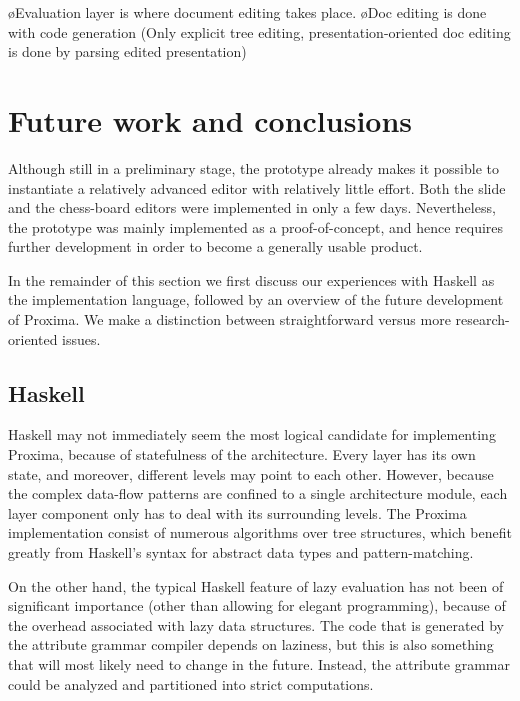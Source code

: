 \bl
\o Evaluation layer is where document editing takes place. 
\o Doc editing is done with code generation (Only explicit tree editing, presentation-oriented doc editing is done by parsing edited presentation)
\el
\ec




\section{Future work and conclusions} \label{sect:protoConcl}

Although still in a preliminary stage, the prototype already makes it possible to instantiate a relatively advanced editor with relatively little effort. Both the slide and the chess-board editors were implemented in only a few days. Nevertheless, the prototype was mainly implemented as a proof-of-concept, and hence requires further development in order to become a generally usable product.

In the remainder of this section we first discuss our experiences with Haskell as the implementation language, followed by an overview of the future development of Proxima. We make a distinction between straightforward versus more research-oriented  issues.

\subsection{Haskell}

Haskell may not immediately seem the most logical candidate for implementing Proxima, because of statefulness of the architecture. Every layer has its own state, and moreover, different levels may point to each other. However, because  the complex data-flow patterns are confined to a single architecture module, each layer component only has to deal with its surrounding levels. The Proxima implementation consist of numerous algorithms over tree structures, which benefit greatly from Haskell's syntax for abstract data types and pattern-matching. 

On the other hand, the typical Haskell feature of lazy evaluation has not been of significant importance (other than allowing for elegant programming), because of the overhead associated with lazy data structures. The code that is generated by the attribute grammar compiler depends on laziness, but this is also something that will most likely need to change in the future. Instead, the attribute grammar could be analyzed and partitioned into strict computations.

